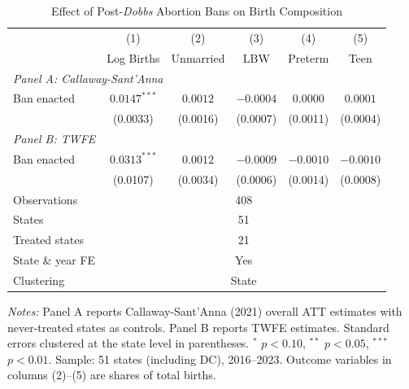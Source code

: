 \begin{table}[H]
\centering
\caption{Effect of Post-\textit{Dobbs} Abortion Bans on Birth Composition}
\begin{threeparttable}
\begin{tabular}{lccccc}
\toprule
 & (1) & (2) & (3) & (4) & (5) \\
 & Log Births & Unmarried & LBW & Preterm & Teen \\
\midrule
\multicolumn{6}{l}{\textit{Panel A: Callaway-Sant'Anna}} \\
Ban enacted & $0.0147^{***}$ & $0.0012$ & $-0.0004$ & $0.0000$ & $0.0001$ \\
 & (0.0033) & (0.0016) & (0.0007) & (0.0011) & (0.0004) \\[0.5em]
\multicolumn{6}{l}{\textit{Panel B: TWFE}} \\
Ban enacted & $0.0313^{***}$ & $0.0012$ & $-0.0009$ & $-0.0010$ & $-0.0010$ \\
 & (0.0107) & (0.0034) & (0.0006) & (0.0014) & (0.0008) \\[0.5em]
\midrule
Observations & \multicolumn{5}{c}{408} \\
States & \multicolumn{5}{c}{51} \\
Treated states & \multicolumn{5}{c}{21} \\
State \& year FE & \multicolumn{5}{c}{Yes} \\
Clustering & \multicolumn{5}{c}{State} \\
\bottomrule
\end{tabular}
\begin{tablenotes}[flushleft]
\small
\item \textit{Notes:} Panel A reports Callaway-Sant'Anna (2021) overall ATT estimates with never-treated states as controls. Panel B reports TWFE estimates. Standard errors clustered at the state level in parentheses. $^{*}$ $p<0.10$, $^{**}$ $p<0.05$, $^{***}$ $p<0.01$. Sample: 51 states (including DC), 2016--2023. Outcome variables in columns (2)--(5) are shares of total births.
\end{tablenotes}
\end{threeparttable}
\label{tab:main}
\end{table}
